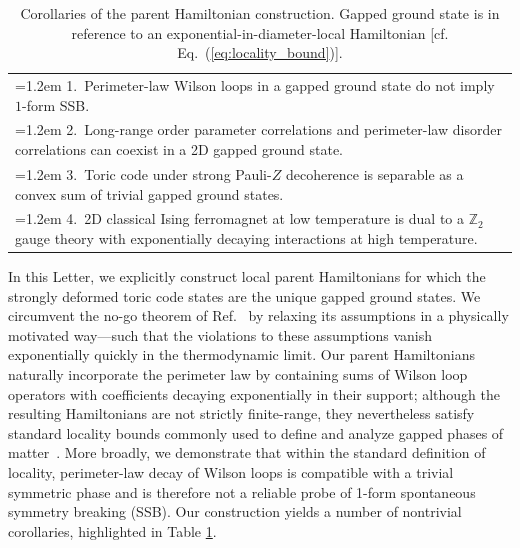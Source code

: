 \documentclass[aps,prl,twocolumn,floatfix,nofootinbib]{revtex4-2}
\theoremstyle{definition}
\begin{document}
\begin{table}[t]
\caption{Corollaries of the parent Hamiltonian construction. Gapped ground state is in reference to an exponential-in-diameter-local Hamiltonian [cf. Eq.~(\ref{eq:locality_bound})].}
\label{tab:corollaries}
\begin{ruledtabular}
\begin{tabular}
{p{}}


\hangindent=1.2em
\hangafter=1
1.\ Perimeter-law Wilson loops in a gapped ground state do not imply $1$-form SSB. \\

\hangindent=1.2em
\hangafter=1
2.\ Long-range order parameter correlations and perimeter-law disorder correlations can coexist in a 2D gapped ground state. \\

\hangindent=1.2em
\hangafter=1
3.\ Toric code under strong Pauli-$Z$ decoherence is separable as a convex sum of trivial gapped ground states.   \\

\hangindent=1.2em
\hangafter=1
4.\ 2D classical Ising ferromagnet at low temperature is dual to a $\mathbb{Z}_2$ gauge theory with exponentially decaying interactions at high temperature. \\
\end{tabular}
\end{ruledtabular}
\end{table}

In this Letter, we explicitly construct local parent Hamiltonians for which the strongly deformed toric code states are the unique gapped ground states. We circumvent the no-go theorem of Ref.~ by relaxing its assumptions in a physically motivated way---such that the violations to these assumptions vanish exponentially quickly in the thermodynamic limit. {Our parent Hamiltonians naturally incorporate the perimeter law by containing sums of Wilson loop operators with coefficients decaying exponentially in their support; although the resulting Hamiltonians are not strictly finite-range, they nevertheless satisfy standard locality bounds commonly used to define and analyze gapped phases of matter~\cite{HastingsKoma2006,hastings_locality_2010}.} More broadly, we demonstrate that within the standard definition of locality, perimeter-law decay of Wilson loops is compatible with a trivial symmetric phase and is therefore not a reliable probe of 1-form spontaneous symmetry breaking (SSB). Our construction yields a number of nontrivial corollaries, highlighted in Table \ref{tab:corollaries}.
\end{document}
